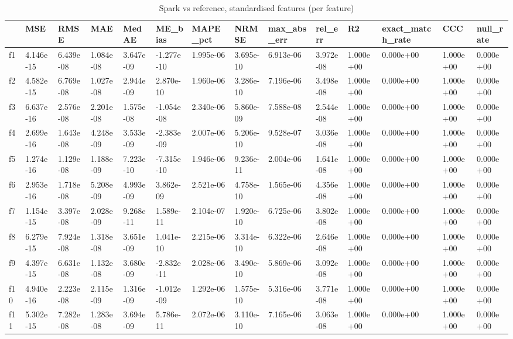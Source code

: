 \begin{table}
\caption{Spark vs reference, standardised features (per feature)}
\label{tab:01_feature_error_scaled}
\begin{tabular}{llllllllllllll}
\toprule
 & MSE & RMSE & MAE & MedAE & ME\_bias & MAPE\_pct & NRMSE & max\_abs\_err & rel\_err & R2 & exact\_match\_rate & CCC & null\_rate \\
\midrule
f1 & 4.146e-15 & 6.439e-08 & 1.084e-08 & 3.647e-09 & -1.277e-10 & 1.995e-06 & 3.695e-10 & 6.913e-06 & 3.972e-08 & 1.000e+00 & 0.000e+00 & 1.000e+00 & 0.000e+00 \\
f2 & 4.582e-15 & 6.769e-08 & 1.027e-08 & 2.944e-09 & 2.870e-10 & 1.960e-06 & 3.286e-10 & 7.196e-06 & 3.498e-08 & 1.000e+00 & 0.000e+00 & 1.000e+00 & 0.000e+00 \\
f3 & 6.637e-16 & 2.576e-08 & 2.201e-08 & 1.575e-08 & -1.054e-08 & 2.340e-06 & 5.860e-09 & 7.588e-08 & 2.544e-08 & 1.000e+00 & 0.000e+00 & 1.000e+00 & 0.000e+00 \\
f4 & 2.699e-16 & 1.643e-08 & 4.248e-09 & 3.533e-09 & -2.383e-09 & 2.007e-06 & 5.206e-10 & 9.528e-07 & 3.036e-08 & 1.000e+00 & 0.000e+00 & 1.000e+00 & 0.000e+00 \\
f5 & 1.274e-16 & 1.129e-08 & 1.188e-09 & 7.223e-10 & -7.315e-10 & 1.946e-06 & 9.236e-11 & 2.004e-06 & 1.641e-08 & 1.000e+00 & 0.000e+00 & 1.000e+00 & 0.000e+00 \\
f6 & 2.953e-16 & 1.718e-08 & 5.208e-09 & 4.993e-09 & 3.862e-09 & 2.521e-06 & 4.758e-10 & 1.565e-06 & 4.356e-08 & 1.000e+00 & 0.000e+00 & 1.000e+00 & 0.000e+00 \\
f7 & 1.154e-15 & 3.397e-08 & 2.028e-09 & 9.268e-11 & 1.589e-11 & 2.104e-07 & 1.920e-10 & 6.725e-06 & 3.802e-08 & 1.000e+00 & 0.000e+00 & 1.000e+00 & 0.000e+00 \\
f8 & 6.279e-15 & 7.924e-08 & 1.318e-08 & 3.651e-09 & 1.041e-10 & 2.215e-06 & 3.314e-10 & 6.322e-06 & 2.646e-08 & 1.000e+00 & 0.000e+00 & 1.000e+00 & 0.000e+00 \\
f9 & 4.397e-15 & 6.631e-08 & 1.132e-08 & 3.680e-09 & -2.832e-11 & 2.028e-06 & 3.490e-10 & 5.869e-06 & 3.092e-08 & 1.000e+00 & 0.000e+00 & 1.000e+00 & 0.000e+00 \\
f10 & 4.940e-16 & 2.223e-08 & 2.115e-09 & 1.316e-09 & -1.012e-09 & 1.292e-06 & 1.575e-10 & 5.316e-06 & 3.771e-08 & 1.000e+00 & 0.000e+00 & 1.000e+00 & 0.000e+00 \\
f11 & 5.302e-15 & 7.282e-08 & 1.283e-08 & 3.694e-09 & 5.786e-11 & 2.072e-06 & 3.110e-10 & 7.165e-06 & 3.063e-08 & 1.000e+00 & 0.000e+00 & 1.000e+00 & 0.000e+00 \\

\end{tabular}
\end{table}
